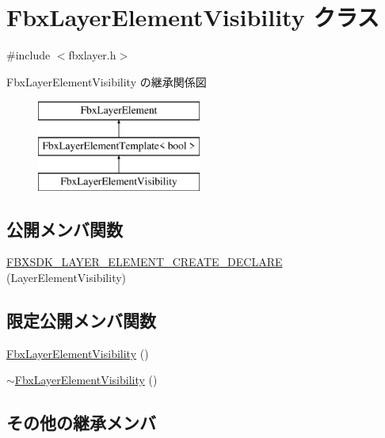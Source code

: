 \hypertarget{class_fbx_layer_element_visibility}{}\section{Fbx\+Layer\+Element\+Visibility クラス}
\label{class_fbx_layer_element_visibility}


{\ttfamily \#include $<$fbxlayer.\+h$>$}

Fbx\+Layer\+Element\+Visibility の継承関係図\begin{figure}[H]
\begin{center}
\leavevmode
\includegraphics[height=3.000000cm]{class_fbx_layer_element_visibility}
\end{center}
\end{figure}
\subsection*{公開メンバ関数}
\begin{DoxyCompactItemize}
\item 
\hyperlink{class_fbx_layer_element_visibility_aeaf11f053c06571e47ffd0e913e963aa}{F\+B\+X\+S\+D\+K\+\_\+\+L\+A\+Y\+E\+R\+\_\+\+E\+L\+E\+M\+E\+N\+T\+\_\+\+C\+R\+E\+A\+T\+E\+\_\+\+D\+E\+C\+L\+A\+RE} (Layer\+Element\+Visibility)
\end{DoxyCompactItemize}
\subsection*{限定公開メンバ関数}
\begin{DoxyCompactItemize}
\item 
\hyperlink{class_fbx_layer_element_visibility_a119e34ab13066e7d602a4e2a1594627c}{Fbx\+Layer\+Element\+Visibility} ()
\item 
\hyperlink{class_fbx_layer_element_visibility_a3d169145ba6514ea1b9b7a052c12d197}{$\sim$\+Fbx\+Layer\+Element\+Visibility} ()
\end{DoxyCompactItemize}
\subsection*{その他の継承メンバ}


